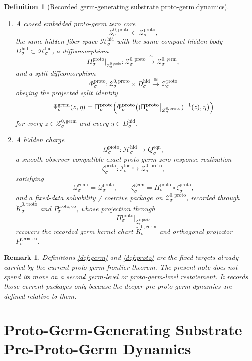 \documentclass[11pt]{article}
\newcommand{\ForSpace}[1]{\mathcal I_{#1}^{\mathrm{for}}}
\newcommand{\EqnTarget}[1]{Q_{#1}^{\mathrm{eqn}}}
\newcommand{\HiddenSpace}[1]{\mathcal H_{#1}^{\mathrm{hid}}}
\newcommand{\HiddenBody}[1]{D_{#1}^{\mathrm{hid}}}
\newcommand{\GermShellSet}[1]{\mathcal Z_{#1}^{\mathrm{germ}}}
\newcommand{\GermZeroCore}[1]{\mathcal Z_{#1}^{0,\mathrm{germ}}}
\newcommand{\GermSplit}[1]{\Phi_{#1}^{\mathrm{germ}}}
\newcommand{\GermCharge}[1]{\mathcal Q_{#1}^{\mathrm{germ}}}
\newcommand{\GermEmbed}[1]{\zeta_{#1}^{\mathrm{germ}}}
\newcommand{\GermKernelCh}[1]{\widetilde K_{#1}^{0,\mathrm{germ}}}
\newcommand{\GermStateComp}[1]{P_{#1}^{\mathrm{germ,co}}}
\newcommand{\ProtoProj}[1]{\Pi_{#1}^{\mathrm{proto}}}
\newcommand{\ProtoShellSet}[1]{\mathcal Z_{#1}^{\mathrm{proto}}}
\newcommand{\ProtoZeroCore}[1]{\mathcal Z_{#1}^{0,\mathrm{proto}}}
\newcommand{\ProtoSplit}[1]{\Phi_{#1}^{\mathrm{proto}}}
\newcommand{\ProtoCharge}[1]{\mathcal Q_{#1}^{\mathrm{proto}}}
\newcommand{\ProtoEmbed}[1]{\zeta_{#1}^{\mathrm{proto}}}
\newcommand{\ProtoKernelCh}[1]{\widetilde K_{#1}^{0,\mathrm{proto}}}
\newcommand{\ProtoStateComp}[1]{P_{#1}^{\mathrm{proto,co}}}
\newtheorem{definition}{Definition}
\newtheorem{remark}{Remark}
\begin{document}
\begin{definition}[Recorded germ-generating substrate proto-germ dynamics]
\begin{enumerate}
\[    \xrightarrow{\cong}
    \GermShellSet{\sigma}.
    \]
    \item A closed embedded proto-germ zero core
    \[
    \ProtoZeroCore{\sigma}\subset\ProtoShellSet{\sigma},
    \]
    the same hidden fiber space \(\HiddenSpace{\sigma}\) with the same compact hidden body \(\HiddenBody{\sigma}\subset\HiddenSpace{\sigma}\), a diffeomorphism
    \[
    \ProtoProj{\sigma}\big|_{\ProtoZeroCore{\sigma}}
    :
    \ProtoZeroCore{\sigma}
    \xrightarrow{\cong}
    \GermZeroCore{\sigma},
    \]
    and a split diffeomorphism
    \[
    \ProtoSplit{\sigma}:
    \ProtoZeroCore{\sigma}\times\HiddenBody{\sigma}
    \xrightarrow{\cong}
    \ProtoShellSet{\sigma}
    \]
    obeying the projected split identity
    \[
    \GermSplit{\sigma}(z,\eta)
    =
    \ProtoProj{\sigma}\Bigl(
    \ProtoSplit{\sigma}\bigl(
    (\ProtoProj{\sigma}\big|_{\ProtoZeroCore{\sigma}})^{-1}(z),\eta
    \bigr)\Bigr)
    \]
    for every \(z\in\GermZeroCore{\sigma}\) and every \(\eta\in\HiddenBody{\sigma}\).
    \item A hidden charge
    \[
    \ProtoCharge{\sigma}:\HiddenSpace{\sigma}\to\EqnTarget{\sigma},
    \]
    a smooth observer-compatible exact proto-germ zero-response realization
    \[
    \ProtoEmbed{\sigma}:\ForSpace{\sigma}\hookrightarrow\ProtoZeroCore{\sigma},
    \]
    satisfying
    \[
    \GermCharge{\sigma}
    =
    \ProtoCharge{\sigma},
    \qquad
    \GermEmbed{\sigma}
    =
    \ProtoProj{\sigma}\circ\ProtoEmbed{\sigma},
    \]
    and a fixed-data solvability / coercive package on \(\ProtoZeroCore{\sigma}\), recorded through \(\ProtoKernelCh{\sigma}\) and \(\ProtoStateComp{\sigma}\), whose projection through
    \[
    \ProtoProj{\sigma}\big|_{\ProtoZeroCore{\sigma}}
    \]
    recovers the recorded germ kernel chart \(\GermKernelCh{\sigma}\) and orthogonal projector \(\GermStateComp{\sigma}\).
\end{enumerate}
\end{definition}

\begin{remark}
Definitions \ref{def:germ} and \ref{def:proto} are the fixed targets already carried by the current proto-germ-frontier theorem. The present note does not spend its move on a second germ-level or proto-germ-level restatement. It records those current packages only because the deeper pre-proto-germ dynamics are defined relative to them.
\end{remark}

\section{Proto-Germ-Generating Substrate Pre-Proto-Germ Dynamics}
\end{document}

